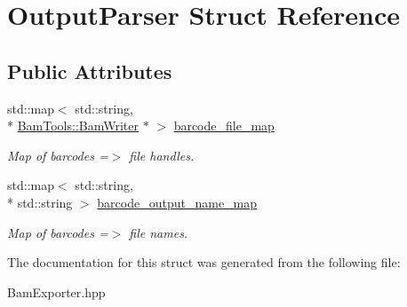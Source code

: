 \hypertarget{structOutputParser}{\section{Output\-Parser Struct Reference}
\label{structOutputParser}
}
\subsection*{Public Attributes}
\begin{DoxyCompactItemize}
\item 
\hypertarget{structOutputParser_ae33ec95adbc793bef138573d48f14a9d}{std\-::map$<$ std\-::string, \\*
\hyperlink{classBamTools_1_1BamWriter}{Bam\-Tools\-::\-Bam\-Writer} $\ast$ $>$ \hyperlink{structOutputParser_ae33ec95adbc793bef138573d48f14a9d}{barcode\-\_\-file\-\_\-map}}\label{structOutputParser_ae33ec95adbc793bef138573d48f14a9d}

\begin{DoxyCompactList}\small\item\em Map of barcodes =$>$ file handles. \end{DoxyCompactList}\item 
\hypertarget{structOutputParser_a6838bcc52fbd0b2a79ddaee085495341}{std\-::map$<$ std\-::string, \\*
std\-::string $>$ \hyperlink{structOutputParser_a6838bcc52fbd0b2a79ddaee085495341}{barcode\-\_\-output\-\_\-name\-\_\-map}}\label{structOutputParser_a6838bcc52fbd0b2a79ddaee085495341}

\begin{DoxyCompactList}\small\item\em Map of barcodes =$>$ file names. \end{DoxyCompactList}\end{DoxyCompactItemize}


The documentation for this struct was generated from the following file\-:\begin{DoxyCompactItemize}
\item 
Bam\-Exporter.\-hpp\end{DoxyCompactItemize}
